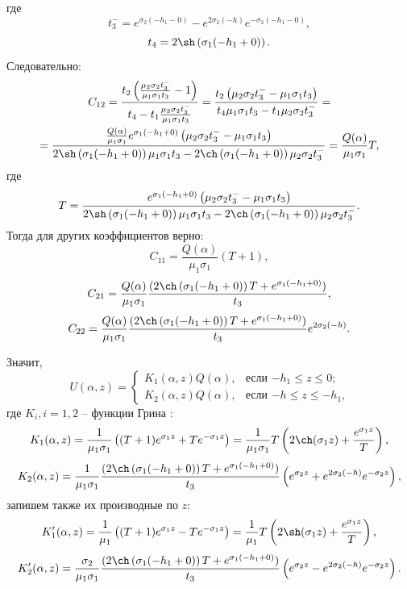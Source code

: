 \documentclass[a4paper, 12pt]{article}
\newcommand{\s}[1]{\sigma_{#1}}
\newcommand{\m}[1]{\mu_{#1}}
\newcommand{\E}[2]{e^{#1 #2}}
\begin{document}
где
$$t_3^-=\E{\s{2}}{(-h_1-0)}- \E{2\s{2}}{(-h)} \E{-\s{2}}{(-h_1-0)},$$
$$t_4=2\sh \left( \s{1} (-h_1+0)\right).$$
Следовательно:
\begin{multline}
    C_{12}=\frac{t_2 \left( \frac{\m{2}\s{2}t_3^-}{\m{1}\s{1}t_3} -1\right)}{t_4-t_1 \frac{\m{2}\s{2}t_3^-}{\m{1}\s{1}t_3}} =\frac{t_2 \left( \m{2}\s{2}t_3^- - \m{1}\s{1}t_3\right)}{t_4 \m{1}\s{1}t_3 - t_1\m{2}\s{2}t_3^-}=\\
    =\frac{\frac{Q(\alpha)}{\m{1} \s{1}} \E{\s{1}}{(-h_1+0)}\left( \m{2}\s{2}t_3^- - \m{1}\s{1}t_3\right)}{2\sh \left( \s{1} (-h_1+0)\right)\m{1}\s{1}t_3 - 2\ch \left( \s{1} (-h_1+0)\right)\m{2}\s{2}t_3^-}=\frac{Q(\alpha)}{\m{1} \s{1}} T,
\end{multline}
где 
$$T=\frac{\E{\s{1}}{(-h_1+0)}\left( \m{2}\s{2}t_3^- - \m{1}\s{1}t_3\right)}{2\sh \left( \s{1} (-h_1+0)\right)\m{1}\s{1}t_3 - 2\ch \left( \s{1} (-h_1+0)\right)\m{2}\s{2}t_3^-}.$$
Тогда для других коэффициентов верно:
$$C_{11}=\frac{Q(\alpha)}{\m{1} \s{1}}(T+1),$$
$$C_{21}=\frac{Q(\alpha)}{\m{1} \s{1}}\frac{(2\ch \left(\s{1}(-h_1+0) \right)T+\E{\s{1}}{(-h_1+0)})}{t_3},$$
$$C_{22}=\frac{Q(\alpha)}{\m{1} \s{1}}\frac{(2\ch \left(\s{1}(-h_1+0) \right)T+\E{\s{1}}{(-h_1+0)})}{t_3}\E{2\s{2}}{(-h)} .$$


Значит,
\[
U(\alpha,z) =
\begin{cases}
K_1(\alpha,z)Q(\alpha), & \text{если $-h_1\leq z \leq0$;} \\
K_2(\alpha,z)Q(\alpha), & \text{если $-h\leq z \leq-h_1$,}
\end{cases}
\]
где $K_i, i=1, 2$ -- функции Грина \cite{g89, new}:
$$K_1(\alpha,z)=\frac{1}{\m{1}\s{1}}\left((T+1)\E{\s{1}}{z}+T\E{-\s{1}}{z} \right)=\frac{1}{\m{1}\s{1}}T \left(2 \ch (\s{1}z) +\frac{\E{\s{1}}{z}}{T}\right),$$
$$K_2(\alpha,z)=\frac{1}{\m{1} \s{1}}\frac{(2\ch \left(\s{1}(-h_1+0) \right)T+\E{\s{1}}{(-h_1+0)})}{t_3}\left(\E{\s{2}}{z}+ \E{2\s{2}}{(-h)} \E{-\s{2}}{z} \right),$$
запишем также их производные по $z$:
$$K_1'(\alpha,z)=\frac{1}{\m{1}}\left((T+1)\E{\s{1}}{z}-T\E{-\s{1}}{z} \right)=\frac{1}{\m{1}}T \left(2 \sh (\s{1}z) +\frac{\E{\s{1}}{z}}{T}\right),$$
$$K_2'(\alpha,z)=\frac{\s{2}}{\m{1} \s{1}}\frac{(2\ch \left(\s{1}(-h_1+0) \right)T+\E{\s{1}}{(-h_1+0)})}{t_3}\left(\E{\s{2}}{z}- \E{2\s{2}}{(-h)} \E{-\s{2}}{z} \right).$$
\end{document}
